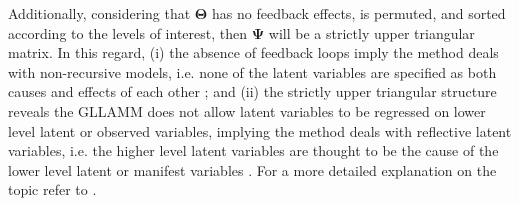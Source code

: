 Additionally, considering that $\pmb{\Theta}$ has no feedback effects, is permuted, and sorted according to the levels of interest, then $\pmb{\Psi}$ will be a strictly upper triangular matrix. In this regard, (i) the absence of feedback loops imply the method deals with non-recursive models, i.e. none of the latent variables are specified as both causes and effects of each other \cite{Kline_2012}; and (ii) the strictly upper triangular structure reveals the GLLAMM does not allow latent variables to be regressed on lower level latent or observed variables, implying the method deals with reflective latent variables, i.e. the higher level latent variables are thought to be the cause of the lower level latent or manifest variables \cite{Beaujean_2014}. For a more detailed explanation on the topic refer to \citet{Edwards_et_al_2000}.

